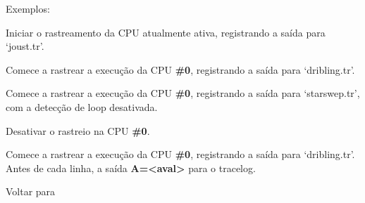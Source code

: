 \documentclass[letterpaper,10pt,brazil]{sphinxmanual}
\begin{document}
\begin{DUlineblock}{0em}
\item[] 
\item[] 
\item[] Exemplos:
\item[] 
\item[]
\begin{DUlineblock}{\DUlineblockindent}
\item[] 
\item[] 
\end{DUlineblock}
\item[] Iniciar o rastreamento da CPU atualmente ativa, registrando a saída para `joust.tr'.
\item[] 
\item[]
\begin{DUlineblock}{\DUlineblockindent}
\item[] 
\item[] 
\end{DUlineblock}
\item[] Comece a rastrear a execução da CPU \textbf{\#0}, registrando a saída para `dribling.tr'.
\item[] 
\item[]
\begin{DUlineblock}{\DUlineblockindent}
\item[] 
\item[] 
\end{DUlineblock}
\item[] Comece a rastrear a execução da CPU \textbf{\#0}, registrando a saída para `starswep.tr', com a detecção de loop desativada.
\item[] 
\item[]
\begin{DUlineblock}{\DUlineblockindent}
\item[] 
\item[] 
\end{DUlineblock}
\item[] Desativar o rastreio na CPU \textbf{\#0}.
\item[] 
\item[]
\begin{DUlineblock}{\DUlineblockindent}
\item[] 
\item[] 
\end{DUlineblock}
\item[] Comece a rastrear a execução da CPU \textbf{\#0}, registrando a saída para `dribling.tr'. Antes de cada linha, a saída \textbf{A=\textless{}aval\textgreater{}} para o tracelog.
\item[] 
\item[] Voltar para {\hyperref[debugger/execution:debugger\string-execution\string-list]{}}
\end{DUlineblock}
\begin{quote}
\label{debugger/execution:debugger-command-traceflush}\end{quote}
\end{document}
